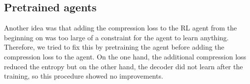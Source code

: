 \subsection{Pretrained agents}
Another idea was that adding the compression loss to the RL agent from the
beginning on was too large of a constraint for the agent to learn anything.
Therefore, we tried to fix this by pretraining the agent before adding
the compression loss to the agent. On the one hand, the additional compression
loss reduced the entropy but on the other hand, the decoder did not learn
after the training, so this procedure showed no improvements.


